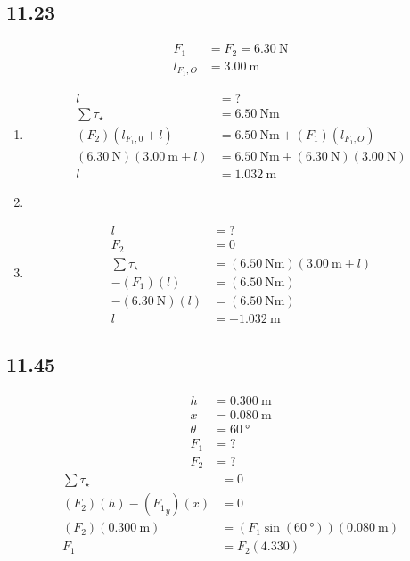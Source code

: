 \documentclass{article}
\begin{document}
\subsection{11.23}
\begin{align*}
	F_1 & = F_2 = \SI{6.30}{\newton} \\
	l_{F_1,O} & = \SI{3.00}{\meter}
\end{align*}
\begin{enumerate}[label=\textbf{(\alph*)}]
	\item
		\begin{align*}
			l & = ? \\
			\sum \tau_\star & = \SI{6.50}{\newton \meter} \\
			(F_2)(l_{F_1,0} + l) & = \SI{6.50}{\newton \meter} + (F_1)(l_{F_1,O}) \\
			(\SI{6.30}{\newton})(\SI{3.00}{\meter} + l) & = \SI{6.50}{\newton \meter} + (\SI{6.30}{\newton})(\SI{3.00}{\newton}) \\
			l & = \SI{1.032}{\meter}
		\end{align*}
	\item
	\item
		\begin{align*}
			l & = ? \\
			F_2 & = 0 \\
			\sum \tau_\star & = (\SI{6.50}{\newton \meter})(\SI{3.00}{\meter} + l) \\
			-(F_1)(l) & = (\SI{6.50}{\newton \meter}) \\
			-(\SI{6.30}{\newton})(l) & = (\SI{6.50}{\newton \meter}) \\
			l & = \SI{-1.032}{\meter}
		\end{align*}
\end{enumerate}

\subsection{11.45}
\begin{align*}
	h & = \SI{0.300}{\meter} \\
	x & = \SI{0.080}{\meter} \\
	\theta & = \SI{60}{\degree} \\
	F_1 & = ? \\
	F_2 & = ?
\end{align*}
\begin{align*}
	\sum \tau_\star & = 0 \\
	(F_2)(h) - ({F_1}_y)(x) & = 0 \\
	(F_2)(\SI{0.300}{\meter}) & = (F_1\sin(\SI{60}{\degree}))(\SI{0.080}{\meter}) \\
	F_1 & = F_2(4.330)
\end{align*}
\end{document}
